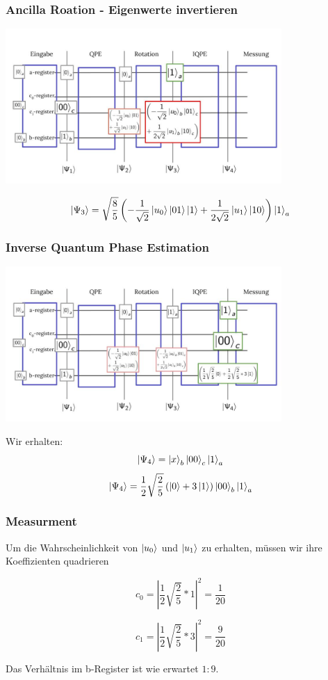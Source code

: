 \begin{frame}
    \frametitle{Ancilla Roation - Eigenwerte invertieren}
    \begin{center}

    \includegraphics[width=10.5cm]{img/example_circuit/example_circuit_3.jpg}
    \end{center}
    $$ \ket{\Psi_3} =\sqrt{\frac{8}{5}}\left(-\frac{1}{\sqrt{2}} \ket{u_0}\ket{01}\ket{1} +\frac{1}{2\sqrt{2}} \ket{u_1} \ket{10}\right)\ket{1}_a$$
\end{frame}

\begin{frame}
    \frametitle{Inverse Quantum Phase Estimation}
    \begin{center}
    \includegraphics[width=10.5cm]{img/example_circuit/example_circuit_4.jpg}
    \end{center}

Wir erhalten:
$$\ket{\Psi_4}= \ket{x}_b \ket{00}_c \ket{1}_a $$
$$ \ket{\Psi_4}=\frac{1}{2}\sqrt{\frac{2}{5}}  \left(\ket{0} +3 \ket{1} \right) \ket{00}_b \ket{1}_a$$
\end{frame}


\begin{frame}
    \frametitle{Measurment}

Um die Wahrscheinlichkeit von $ \ket{u_0}$ und $\ket{u_1}$ zu erhalten, müssen wir ihre Koeffizienten quadrieren

$$ c_0=\left|\frac{1}{2}\sqrt{\frac{2}{5}}*1\right|^2 = \frac{1}{20} $$

$$ c_1=\left|\frac{1}{2}\sqrt{\frac{2}{5}}*3\right|^2 = \frac{9}{20} $$

Das Verhältnis im b-Register ist wie erwartet $1:9$.

\end{frame}






